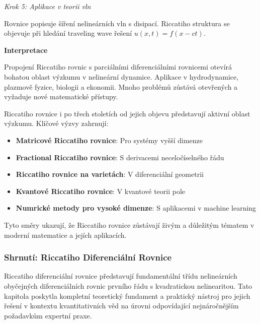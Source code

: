 \begin{example}
\noindent\textit{Krok 5: Aplikace v teorii vln}

Rovnice popisuje šíření nelineárních vln s disipací. Riccatiho struktura 
se objevuje při hledání traveling wave řešení $u(x,t) = f(x - ct)$.

\vspace{1.5\baselineskip}

\noindent\textbf{Interpretace}

Propojení Riccatiho rovnic s parciálními diferenciálními rovnicemi otevírá 
bohatou oblast výzkumu v nelineární dynamice. Aplikace v hydrodynamice, 
plazmově fyzice, biologii a ekonomii. Mnoho problémů zůstává otevřených 
a vyžaduje nové matematické přístupy.

\end{example}

\vspace{2\baselineskip}

\begin{remark}
\label{rem:budouci-smyry-vyzkumu}
Riccatiho rovnice i po třech stoletích od jejich objevu představují aktivní 
oblast výzkumu. Klíčové výzvy zahrnují:

\begin{itemize}
\item \textbf{Matricové Riccatiho rovnice}: Pro systémy vyšší dimenze
\item \textbf{Fractional Riccatiho rovnice}: S derivacemi neceločíselného řádu
\item \textbf{Riccatiho rovnice na varietách}: V diferenciální geometrii
\item \textbf{Kvantové Riccatiho rovnice}: V kvantové teorii pole
\item \textbf{Numrické metody pro vysoké dimenze}: S aplikacemi v machine learning
\end{itemize}

Tyto směry ukazují, že Riccatiho rovnice zůstávají živým a důležitým tématem 
v moderní matematice a jejích aplikacích.
\end{remark}

\vspace{0.8\baselineskip}

\subsubsection{Shrnutí: Riccatiho Diferenciální Rovnice}
\label{subsec:shrnutí-riccatiho}

Riccatiho diferenciální rovnice představují fundamentální třídu nelineárních obyčejných diferenciálních rovnic prvního řádu s kvadratickou nelinearitou. Tato kapitola poskytla kompletní teoretický fundament a praktický nástroj pro jejich řešení v kontextu kvantitativních věd na úrovni odpovídající nejnáročnějším požadavkům expertní praxe.

